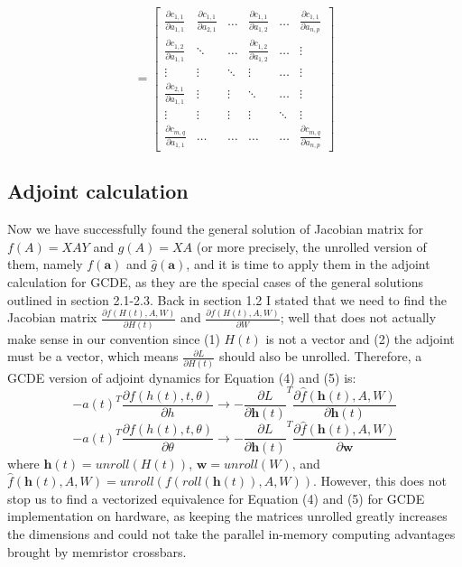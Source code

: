 \documentclass{article}
\begin{document}
\begin{equation}
    = \begin{bmatrix}
    \frac{\partial c_{1,1}}{\partial a_{1,1}} & \frac{\partial c_{1,1}}{\partial a_{2,1}} &\hdots &  \frac{\partial c_{1,1}}{\partial a_{1,2}} &\hdots & \frac{\partial c_{1,1}}{\partial a_{n,p}} \\
    \frac{\partial c_{1,2}}{\partial a_{1,1}}  & \ddots &\hdots & \frac{\partial c_{1,2}}{\partial a_{1,2}}& \hdots& \vdots \\
    \vdots & \vdots & \ddots & \vdots & \hdots & \vdots\\
    \frac{\partial c_{2,1}}{\partial a_{1,1}} & \vdots & \vdots & \ddots & \hdots & \vdots\\
    \vdots & \vdots & \vdots & \vdots & \ddots & \vdots\\
    \frac{\partial c_{m,q}}{\partial a_{1,1}}  & \hdots & \hdots & \hdots & \hdots & \frac{\partial c_{m,q}}{\partial a_{n,p}}
\end{bmatrix}
\end{equation}


\subsection{Adjoint calculation}
Now we have successfully found the general solution of Jacobian matrix for $f(A)=XAY$ and $g(A)=XA$ (or more precisely, the unrolled version of them, namely $f(\mathbf{a})$ and $\widehat{g}(\mathbf{a})$, and it is time to apply them in the adjoint calculation for GCDE, as they are the special cases of the general solutions outlined in section 2.1-2.3. Back in section 1.2 I stated that we need to find the Jacobian matrix $\frac{\partial f(H(t), A, W)}{\partial H(t)}$ and $\frac{\partial f(H(t), A, W)}{\partial W}$; well that does not actually make sense in our convention since (1) $H(t)$ is not a vector and (2) the adjoint must be a vector, which means $\frac{\partial L}{\partial H(t)}$ should also be unrolled. Therefore, a GCDE version of adjoint dynamics for Equation (4) and (5) is:
\begin{equation}
    -a(t)^{T}\frac{\partial f(h(t), t, \theta)}{\partial h} \rightarrow 
    -\frac{\partial L}{\partial \mathbf{h}(t)}^{T}  \frac{\partial \widehat{f}(\mathbf{h}(t), A, W)}{\partial \mathbf{h}(t)} 
\end{equation}
\begin{equation}
    -a(t)^{T}\frac{\partial f(h(t), t, \theta)}{\partial \theta} \rightarrow
        -\frac{\partial L}{\partial \mathbf{h}(t)}^{T}  \frac{\partial \widehat{f}(\mathbf{h}(t), A, W)}{\partial \mathbf{w}}
\end{equation}
where $\mathbf{h}(t) = unroll(H(t))$, $\mathbf{w} = unroll(W)$, and $\widehat{f}(\mathbf{h}(t), A, W) = unroll(f(roll(\mathbf{h}(t)), A, W))$.
However, this does not stop us to find a vectorized equivalence for Equation (4) and (5) for GCDE implementation on hardware, as keeping the matrices unrolled greatly increases the dimensions and could not take the parallel in-memory computing advantages brought by memristor crossbars. 
\end{document}
